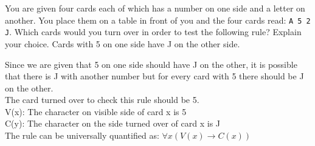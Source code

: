 \documentclass[a4paper]{exam}
\begin{document}
\begin{questions}
 You are given four cards each of which has a number on one side and a letter on another. You place them on a table in front of you and the four cards read: \texttt{A 5 2 J}. Which cards would you turn over in order to test the following rule? Explain your choice.
      {\quotation Cards with 5 on one side have J on the other side.}

  \begin{solution}
    Since we are given that 5 on one side should have J on the other, it is possible that there is J with another number but for every card with 5 there should be J on the other.\\
    The card turned over to check this rule should be 5.\\

    V(x): The character on visible side of card x is 5 \\
    C(y): The character on the side turned over of card x is J\\
    The rule can be universally quantified as: $\forall x (V(x) \rightarrow C(x))$
    
  \end{solution}

  
\end{questions}
\end{document}
